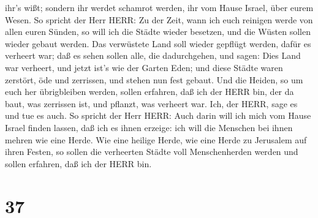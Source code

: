 ihr's wißt; sondern ihr werdet schamrot werden, ihr vom Hause Israel,
über eurem Wesen.  So spricht der Herr HERR: Zu der Zeit,
wann ich euch reinigen werde von allen euren Sünden, so will ich die
Städte wieder besetzen, und die Wüsten sollen wieder gebaut werden.
 Das verwüstete Land soll wieder gepflügt werden, dafür es
verheert war; daß es sehen sollen alle, die dadurchgehen, 
und sagen: Dies Land war verheert, und jetzt ist's wie der Garten Eden;
und diese Städte waren zerstört, öde und zerrissen, und stehen nun fest
gebaut.  Und die Heiden, so um euch her übrigbleiben
werden, sollen erfahren, daß ich der HERR bin, der da baut, was
zerrissen ist, und pflanzt, was verheert war. Ich, der HERR, sage es und
tue es auch.  So spricht der Herr HERR: Auch darin will ich
mich vom Hause Israel finden lassen, daß ich es ihnen erzeige: ich will
die Menschen bei ihnen mehren wie eine Herde.  Wie eine
heilige Herde, wie eine Herde zu Jerusalem auf ihren Festen, so sollen
die verheerten Städte voll Menschenherden werden und sollen erfahren,
daß ich der HERR bin.

\hypertarget{section-36}{%
\section{37}\label{section-36}}

